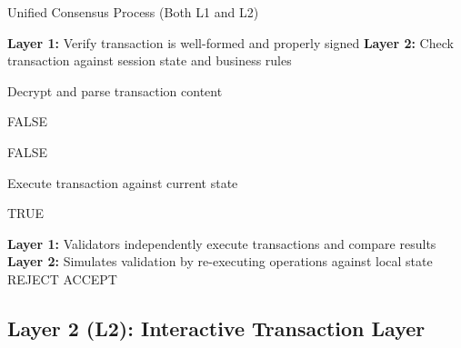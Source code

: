 \documentclass[conference]{IEEEtran}
\begin{document}
\begin{algorithm}[t]
\caption{Unified Consensus Process (Both L1 and L2)}
\label{algorithm:validate-tx-process-proposal}
\begin{algorithmic}[1]

    \State \textbf{Layer 1:} Verify transaction is well-formed and properly signed
    \State \textbf{Layer 2:} Check transaction against session state and business rules
    
    \State Decrypt and parse transaction content
    
        \State \Return FALSE 
    \EndIf
    
        \State \Return FALSE 
    \EndIf
    
    \State Execute transaction against current state
    
    \State \Return TRUE 
\EndProcedure


    \State \textbf{Layer 1:} Validators independently execute transactions and compare results
    \State \textbf{Layer 2:} Simulates validation by re-executing operations against local state
        \State \Return REJECT 
    \Else
        \State \Return ACCEPT 
\EndIf
\EndProcedure



\end{algorithmic}
\end{algorithm}

\subsection{Layer 2 (L2): Interactive Transaction Layer}
\end{document}
